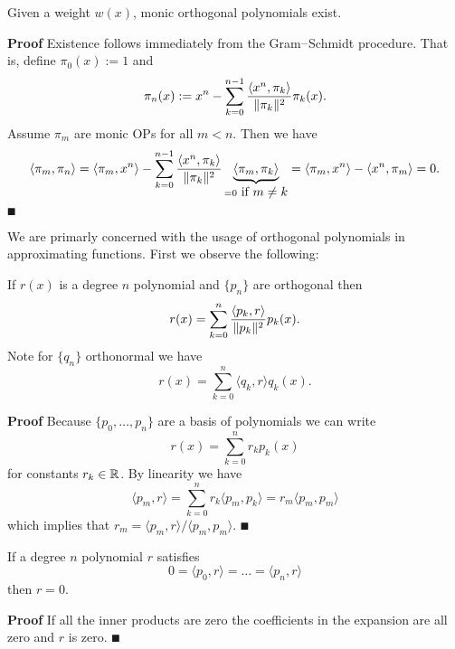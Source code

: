 \begin{proposition}[existence] Given a weight $w(x)$, monic orthogonal polynomials exist.

\end{proposition}
\textbf{Proof} Existence follows immediately from the Gram\ensuremath{\endash}Schmidt procedure. That is, define $\ensuremath{\pi}_0(x) := 1$ and
\[
\ensuremath{\pi}_n(x) := x^n - \ensuremath{\sum}_{k=0}^{n-1} {\ensuremath{\langle}x^n,\ensuremath{\pi}_k\ensuremath{\rangle} \over \|\ensuremath{\pi}_k\|^2} \ensuremath{\pi}_k(x).
\]
Assume $\ensuremath{\pi}_m$ are monic OPs for all $m < n$. Then we have
\[
\ensuremath{\langle}\ensuremath{\pi}_m, \ensuremath{\pi}_n\ensuremath{\rangle} = \ensuremath{\langle}\ensuremath{\pi}_m, x^n \ensuremath{\rangle} - \ensuremath{\sum}_{k=0}^{n-1} {\ensuremath{\langle}x^n,\ensuremath{\pi}_k\ensuremath{\rangle} \over \|\ensuremath{\pi}_k\|^2} \underbrace{\ensuremath{\langle}\ensuremath{\pi}_m, \ensuremath{\pi}_k\ensuremath{\rangle}}_{= 0 \hbox{ if $m \ensuremath{\neq} k$}}  = \ensuremath{\langle}\ensuremath{\pi}_m, x^n \ensuremath{\rangle} - \ensuremath{\langle}x^n,\ensuremath{\pi}_m\ensuremath{\rangle} = 0.
\]
\ensuremath{\QED}

We are primarly concerned with the usage of orthogonal polynomials in approximating functions. First we observe the following:

\begin{proposition}[expansion] If $r(x)$ is a degree $n$ polynomial and $\{p_n\}$ are orthogonal then
\[
r(x) = \ensuremath{\sum}_{k=0}^n {\ensuremath{\langle}p_k,r\ensuremath{\rangle} \over \|p_k\|^2} p_k(x).
\]
Note for $\{q_n\}$ orthonormal we have
\[
r(x) = \ensuremath{\sum}_{k=0}^n \ensuremath{\langle}q_k,r\ensuremath{\rangle} q_k(x).
\]
\end{proposition}
\textbf{Proof} Because $\{p_0,\ensuremath{\ldots},p_n \}$ are a basis of polynomials we can write
\[
r(x) = \ensuremath{\sum}_{k=0}^n r_k p_k(x)
\]
for constants $r_k \in {\mathbb R}$. By linearity we have
\[
\ensuremath{\langle}p_m,r\ensuremath{\rangle} = \ensuremath{\sum}_{k=0}^n r_k \ensuremath{\langle}p_m,p_k\ensuremath{\rangle}= r_m \ensuremath{\langle}p_m,p_m\ensuremath{\rangle}
\]
which implies that $r_m = \ensuremath{\langle}p_m,r\ensuremath{\rangle}/\ensuremath{\langle}p_m,p_m\ensuremath{\rangle}$. \ensuremath{\QED}

\begin{corollary} If a degree $n$ polynomial $r$ satisfies
\[
0 = \ensuremath{\langle}p_0,r\ensuremath{\rangle} = \ensuremath{\ldots} = \ensuremath{\langle}p_n,r\ensuremath{\rangle}
\]
then $r = 0$.

\end{corollary}
\textbf{Proof} If all the inner products are zero the coefficients in the expansion are all zero and $r$ is zero. \ensuremath{\QED}

